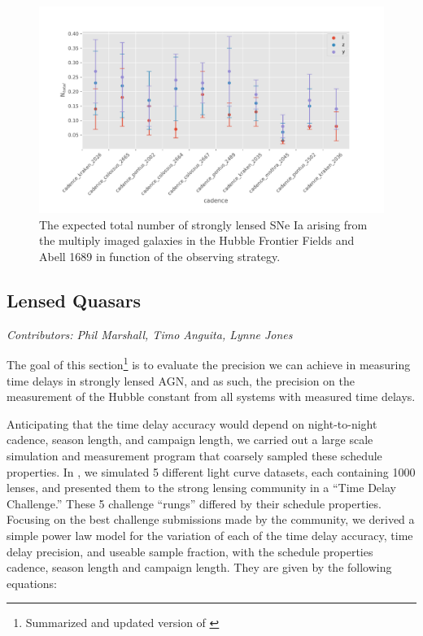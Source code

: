 \begin{figure}
\centering
\includegraphics[scale=0.65]{figures/sl_galaxy_lensing.pdf}\caption{The expected total number of strongly lensed SNe Ia arising from the multiply imaged galaxies in the Hubble Frontier Fields and Abell 1689 in function of the observing strategy. }
\end{figure}


\subsection{Lensed Quasars}
\textit{Contributors: Phil Marshall, Timo Anguita, Lynne Jones}


The goal of this section\footnote{Summarized and updated version of
\citep[Cosmology chapter of][]{LSSTScienceCollaboration2017}} is to
evaluate the precision we can achieve in measuring time delays in
strongly lensed AGN, and as such, the precision on the measurement
of the Hubble constant from all systems with measured time delays.

Anticipating that the time delay accuracy would depend on night-to-night
cadence, season length, and campaign length, we carried out a large
scale simulation and measurement program that coarsely sampled these
schedule properties. In \cite{Liao2015}, we simulated 5 different
light curve datasets, each containing 1000 lenses, and presented them to
the strong lensing community in a ``Time Delay Challenge.'' These 5
challenge ``rungs'' differed by their schedule properties. Focusing on the best challenge
submissions made by the community, we derived a simple power law model
for the variation of each of the time delay accuracy, time delay
precision, and useable sample fraction, with the schedule properties
cadence, season length and campaign length. They are
given by the following equations:

